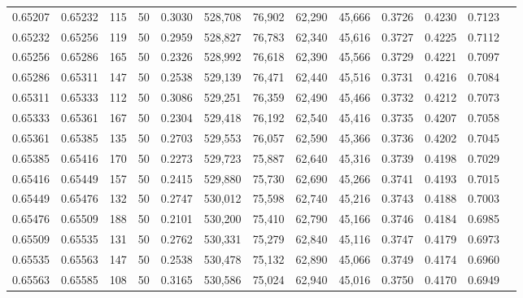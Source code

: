 \begin{tabular}{rrrrrrrrrrrrr}
0.65207 & 0.65232 &   115 &  50 &                                     0.3030 & 528,708 &  76,902 &  62,290 &  45,666 & 0.3726 & 0.4230 & 0.7123 \\
0.65232 & 0.65256 &   119 &  50 &                                     0.2959 & 528,827 &  76,783 &  62,340 &  45,616 & 0.3727 & 0.4225 & 0.7112 \\
0.65256 & 0.65286 &   165 &  50 &                                     0.2326 & 528,992 &  76,618 &  62,390 &  45,566 & 0.3729 & 0.4221 & 0.7097 \\
0.65286 & 0.65311 &   147 &  50 &                                     0.2538 & 529,139 &  76,471 &  62,440 &  45,516 & 0.3731 & 0.4216 & 0.7084 \\
0.65311 & 0.65333 &   112 &  50 &                                     0.3086 & 529,251 &  76,359 &  62,490 &  45,466 & 0.3732 & 0.4212 & 0.7073 \\
0.65333 & 0.65361 &   167 &  50 &                                     0.2304 & 529,418 &  76,192 &  62,540 &  45,416 & 0.3735 & 0.4207 & 0.7058 \\
0.65361 & 0.65385 &   135 &  50 &                                     0.2703 & 529,553 &  76,057 &  62,590 &  45,366 & 0.3736 & 0.4202 & 0.7045 \\
0.65385 & 0.65416 &   170 &  50 &                                     0.2273 & 529,723 &  75,887 &  62,640 &  45,316 & 0.3739 & 0.4198 & 0.7029 \\
0.65416 & 0.65449 &   157 &  50 &                                     0.2415 & 529,880 &  75,730 &  62,690 &  45,266 & 0.3741 & 0.4193 & 0.7015 \\
0.65449 & 0.65476 &   132 &  50 &                                     0.2747 & 530,012 &  75,598 &  62,740 &  45,216 & 0.3743 & 0.4188 & 0.7003 \\
0.65476 & 0.65509 &   188 &  50 &                                     0.2101 & 530,200 &  75,410 &  62,790 &  45,166 & 0.3746 & 0.4184 & 0.6985 \\
0.65509 & 0.65535 &   131 &  50 &                                     0.2762 & 530,331 &  75,279 &  62,840 &  45,116 & 0.3747 & 0.4179 & 0.6973 \\
0.65535 & 0.65563 &   147 &  50 &                                     0.2538 & 530,478 &  75,132 &  62,890 &  45,066 & 0.3749 & 0.4174 & 0.6960 \\
0.65563 & 0.65585 &   108 &  50 &                                     0.3165 & 530,586 &  75,024 &  62,940 &  45,016 & 0.3750 & 0.4170 & 0.6949 \\

\end{tabular}
